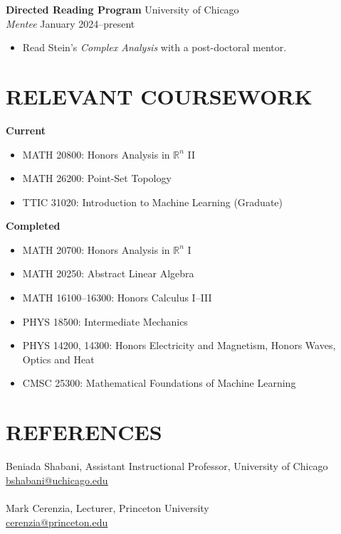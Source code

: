\documentclass[a4paper, 11pt]{extarticle}
\begin{document}
\noindent
\textbf{Directed Reading Program} \hfill University of Chicago \\
\textit{Mentee} \hfill January 2024--present
\begin{itemize}
    \item Read Stein's \textit{Complex Analysis} with a post-doctoral mentor.
\end{itemize}

\section*{RELEVANT COURSEWORK}
\textbf{Current}
\begin{itemize}
    \item MATH 20800: Honors Analysis in $\mathbb{R}^n$ II
    \item MATH 26200: Point-Set Topology
    \item TTIC 31020: Introduction to Machine Learning (Graduate)
\end{itemize}
\textbf{Completed}
\begin{itemize}
    \item MATH 20700: Honors Analysis in $\mathbb{R}^n$ I
    \item MATH 20250: Abstract Linear Algebra
    \item MATH 16100--16300: Honors Calculus I--III
    \item PHYS 18500: Intermediate Mechanics
    \item PHYS 14200, 14300: Honors Electricity and Magnetism, Honors Waves, Optics and Heat
    \item CMSC 25300: Mathematical Foundations of Machine Learning
\end{itemize}

\section*{REFERENCES}
Beniada Shabani, Assistant Instructional Professor, University of Chicago\\
\href{mailto:bshabani@uchicago.edu}{\underline{bshabani@uchicago.edu}}\\
\\
Mark Cerenzia, Lecturer, Princeton University\\
\href{mailto:cerenzia@princeton.edu}{\underline{cerenzia@princeton.edu}}
\end{document}
